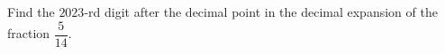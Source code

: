 Find the $2023$-rd digit after the decimal point in the decimal expansion of the fraction $\dfrac{5}{14}$.
